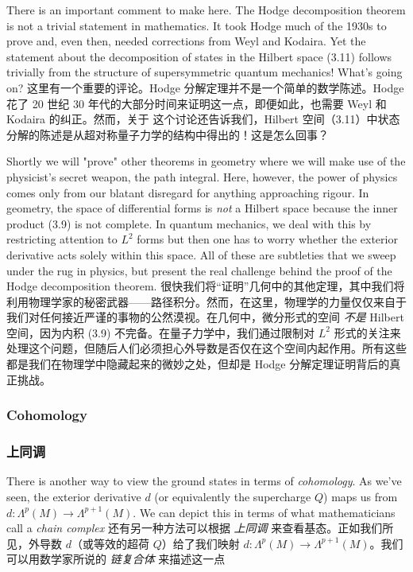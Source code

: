 \documentclass{ctexart}
\begin{document}
\begin{paracol}{2}
There is an important comment to make here. The Hodge decomposition theorem is not a trivial statement in mathematics. It took Hodge much of the 1930s to prove and, even then, needed corrections from Weyl and Kodaira. Yet the statement about the decomposition of states in the Hilbert space (3.11) follows trivially from the structure of supersymmetric quantum mechanics! What’s going on?
\switchcolumn
这里有一个重要的评论。Hodge 分解定理并不是一个简单的数学陈述。Hodge 花了 20 世纪 30 年代的大部分时间来证明这一点，即便如此，也需要 Weyl 和 Kodaira 的纠正。然而，关于 这个讨论还告诉我们，Hilbert 空间（3.11）中状态分解的陈述是从超对称量子力学的结构中得出的！这是怎么回事？
\switchcolumn*

Shortly we will "prove" other theorems in geometry where we will make use of the physicist’s secret weapon, the path integral. Here, however, the power of physics comes only from our blatant disregard for anything approaching rigour. In geometry, the space of differential forms is \textit{not} a Hilbert space because the inner product (3.9) is not complete. In quantum mechanics, we deal with this by restricting attention to $L^2$ forms but then one has to worry whether the exterior derivative acts solely within this space. All of these are subtleties that we sweep under the rug in physics, but present the real challenge behind the proof of the Hodge decomposition theorem.
\switchcolumn
很快我们将“证明”几何中的其他定理，其中我们将利用物理学家的秘密武器——路径积分。然而，在这里，物理学的力量仅仅来自于我们对任何接近严谨的事物的公然漠视。在几何中，微分形式的空间 \textit{不是} Hilbert 空间，因为内积 (3.9) 不完备。在量子力学中，我们通过限制对 $L^2$ 形式的关注来处理这个问题，但随后人们必须担心外导数是否仅在这个空间内起作用。所有这些都是我们在物理学中隐藏起来的微妙之处，但却是 Hodge 分解定理证明背后的真正挑战。
\switchcolumn*

\subsubsection*{Cohomology}
\switchcolumn
\subsubsection*{上同调}
\switchcolumn*

There is another way to view the ground states in terms of \textit{cohomology}. As we’ve seen, the exterior derivative $d$ (or equivalently the supercharge $Q$) maps us from $d: \Lambda^p(M) \to \Lambda^{p + 1}(M)$. We can depict this in terms of what mathematicians call a \textit{chain complex}
\switchcolumn
还有另一种方法可以根据 \textit{上同调} 来查看基态。正如我们所见，外导数 $d$（或等效的超荷 $Q$）给了我们映射 $d: \Lambda^p(M) \to \Lambda^{p + 1}(M)$。我们可以用数学家所说的 \textit{链复合体} 来描述这一点
\end{paracol}
\end{document}
